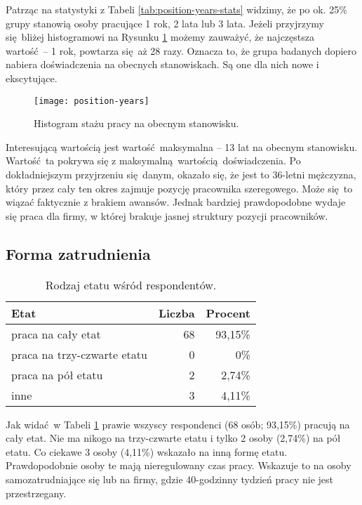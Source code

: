 Patrząc na statystyki z Tabeli \ref{tab:position-years-stats} widzimy, że po ok. 25\% grupy stanowią osoby pracujące 1 rok, 2 lata lub 3 lata. Jeżeli przyjrzymy się bliżej histogramowi na Rysunku \ref{fig:position-years} możemy zauważyć, że najczęstsza wartość -- 1 rok, powtarza się aż 28 razy. Oznacza to, że grupa badanych dopiero nabiera doświadczenia na obecnych stanowiskach. Są one dla nich nowe i ekscytujące.

\begin{figure}[h]
\begin{center}
\texttt{[image: position-years]}
\end{center}
\caption{Histogram stażu pracy na obecnym stanowisku.}
\label{fig:position-years}
\end{figure}

Interesującą wartością jest wartość maksymalna -- 13 lat na obecnym stanowisku. Wartość ta pokrywa się z maksymalną wartością doświadczenia. Po dokładniejszym przyjrzeniu się danym, okazało się, że jest to 36-letni mężczyzna, który przez cały ten okres zajmuje pozycję pracownika szeregowego. Może się to wiązać faktycznie z brakiem awansów. Jednak bardziej prawdopodobne wydaje się praca dla firmy, w której brakuje jasnej struktury pozycji pracowników.

\subsection{Forma zatrudnienia}

\begin{table}[h!]
\begin{center}
\begin{tabular}{l r r}
Etat & Liczba & Procent \\ \hline
praca na cały etat & 68 & 93,15\% \\
praca na trzy-czwarte etatu & 0 & 0\% \\
praca na pół etatu & 2 & 2,74\% \\
inne & 3 & 4,11\% \\
\end{tabular}
\end{center}
\caption{Rodzaj etatu wśród respondentów.}
\label{tab:work-time-stats}
\end{table}

Jak widać w Tabeli \ref{tab:work-time-stats} prawie wszyscy respondenci (68 osób; 93,15\%) pracują na cały etat. Nie ma nikogo na trzy-czwarte etatu i tylko 2 osoby (2,74\%) na pół etatu. Co ciekawe 3 osoby (4,11\%) wskazało na inną formę etatu. Prawdopodobnie osoby te mają nieregulowany czas pracy. Wskazuje to na osoby samozatrudniające się lub na firmy, gdzie 40-godzinny tydzień pracy nie jest przestrzegany.

